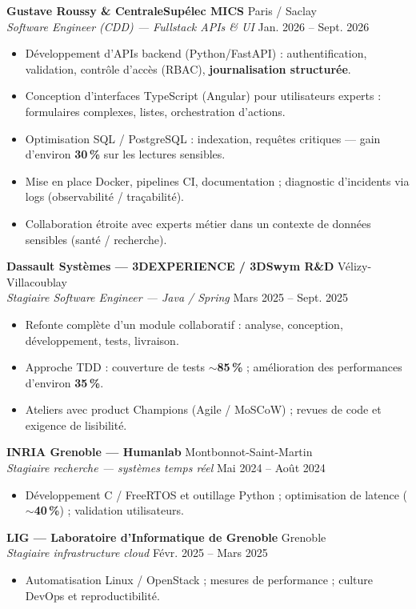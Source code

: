 \documentclass[10pt,a4paper]{article}
\begin{document}
\textbf{Gustave Roussy \& CentraleSup\'elec MICS} \hfill Paris / Saclay\\
\textit{Software Engineer (CDD) --- Fullstack APIs \& UI} \hfill Jan. 2026 -- Sept. 2026
\begin{itemize}
  \item D\'eveloppement d'APIs backend (Python/FastAPI) : authentification, validation, contr\^ole d'acc\`es (RBAC), \textbf{journalisation structur\'ee}.
  \item Conception d'interfaces TypeScript (Angular) pour utilisateurs experts : formulaires complexes, listes, orchestration d'actions.
  \item Optimisation SQL / PostgreSQL : indexation, requ\^etes critiques --- gain d'environ \textbf{30\,\%} sur les lectures sensibles.
  \item Mise en place Docker, pipelines CI, documentation ; diagnostic d'incidents via logs (observabilit\'e / tra\c{c}abilit\'e).
  \item Collaboration \'etroite avec experts m\'etier dans un contexte de donn\'ees sensibles (sant\'e / recherche).
\end{itemize}

\textbf{Dassault Syst\`emes --- 3DEXPERIENCE / 3DSwym R\&D} \hfill V\'elizy-Villacoublay\\
\textit{Stagiaire Software Engineer --- Java / Spring} \hfill Mars 2025 -- Sept. 2025
\begin{itemize}
  \item Refonte compl\`ete d'un module collaboratif : analyse, conception, d\'eveloppement, tests, livraison.
  \item Approche TDD : couverture de tests $\sim$\textbf{85\,\%} ; am\'elioration des performances d'environ \textbf{35\,\%}.
  \item Ateliers avec product Champions (Agile / MoSCoW) ; revues de code et exigence de lisibilit\'e.
\end{itemize}

\textbf{INRIA Grenoble --- Humanlab} \hfill Montbonnot-Saint-Martin\\
\textit{Stagiaire recherche --- syst\`emes temps r\'eel} \hfill Mai 2024 -- Ao\^ut 2024
\begin{itemize}
  \item D\'eveloppement C / FreeRTOS et outillage Python ; optimisation de latence ($\sim$\textbf{40\,\%}) ; validation utilisateurs.
\end{itemize}

\textbf{LIG --- Laboratoire d'Informatique de Grenoble} \hfill Grenoble\\
\textit{Stagiaire infrastructure cloud} \hfill F\'evr. 2025 -- Mars 2025
\begin{itemize}
  \item Automatisation Linux / OpenStack ; mesures de performance ; culture DevOps et reproductibilit\'e.
\end{itemize}
\end{document}
